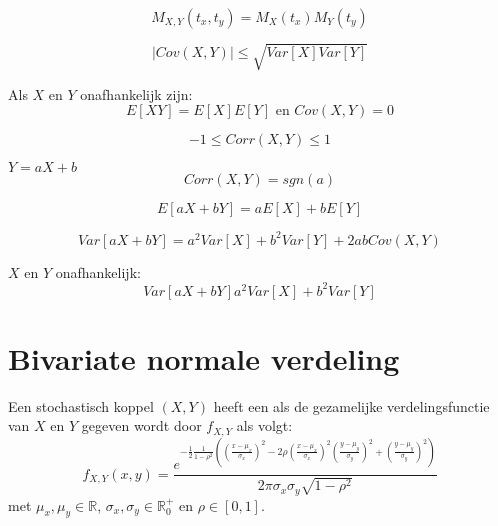 \documentclass[main.tex]{subfiles}
\begin{document}
\begin{gev}
  \[ M_{X,Y}(t_{x},t_{y}) = M_{X}(t_{x}) M_{Y}(t_{y}) \]
\end{gev}

\begin{st}
  \[ |Cov(X,Y)| \le \sqrt{Var[X]Var[Y]} \]
\end{st}

\begin{st}
  Als $X$ en $Y$ onafhankelijk zijn:
  \[ E[XY] = E[X]E[Y] \text{ en } Cov(X,Y) = 0 \]
\end{st}

\begin{gev}
  \[ -1 \le Corr(X,Y) \le 1 \]
\end{gev}

\begin{gev}
  $Y = aX+b$
  \[ Corr(X,Y) = sgn(a) \]
\end{gev}

\begin{st}
  \[ E[aX + bY] = aE[X] + bE[Y] \]
\end{st}

\begin{st}
  \[ Var[aX+bY] = a^{2}Var[X] + b^{2}Var[Y] + 2abCov(X,Y) \]
\end{st}

\begin{gev}
  $X$ en $Y$ onafhankelijk:
  \[ Var[aX+bY]  a^{2}Var[X] + b^{2}Var[Y]\]
\end{gev}

\section{Bivariate normale verdeling}
\label{sec:bivar-norm-verd}

\begin{de}
  Een stochastisch koppel $(X,Y)$ heeft een  als de gezamelijke verdelingsfunctie van $X$ en $Y$ gegeven wordt door $f_{X,Y}$ als volgt:
  \[
  f_{X,Y}(x,y)
  =
  \frac
  {
    e^{-\frac{1}{2}\frac{1}{1-\rho^{2}}
      \left(
          \left(\frac{x-\mu_{x}}{\sigma_{x}}\right)^{2}
        - 2\rho\left(\frac{x-\mu_{x}}{\sigma_{x}}\right)^{2}\left(\frac{y-\mu_{y}}{\sigma_{y}}\right)^{2}
        + \left(\frac{y-\mu_{y}}{\sigma_{y}}\right)^{2}
      \right)
      }
  }
  {
    2\pi\sigma_{x}\sigma_{y}\sqrt{1-\rho^{2}}
  }
  \]
  met $\mu_{x},\mu_{y}\in \mathbb{R}$, $\sigma_{x},\sigma_{y}\in \mathbb{R}_{0}^{+}$ en $\rho \in [0,1]$.
\end{de}
\end{document}
